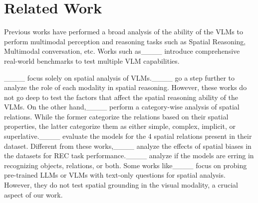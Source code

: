 \section{Related Work}
\label{sec:rel work}
Previous works have performed a broad analysis of the ability of the VLMs to perform multimodal perception and reasoning tasks such as Spatial Reasoning, Multimodal conversation, etc. Works such as____ introduce comprehensive real-world benchmarks to test multiple VLM capabilities.

____ focus solely on spatial analysis of VLMs.____ go a step further to analyze the role of each modality in spatial reasoning. However, these works do not go deep to test the factors that affect the spatial reasoning ability of the VLMs. On the other hand,____ perform a category-wise analysis of spatial relations. While the former categorize the relations based on their spatial properties, the latter categorize them as either simple, complex, implicit, or superlative.____ evaluate the models for the 4 spatial relations present in their dataset. Different from these works,____ analyze the effects of spatial biases in the datasets for REC task performance.____ analyze if the models are erring in recognizing objects, relations, or both. Some works like____ focus on probing pre-trained LLMs or VLMs with text-only questions for spatial analysis. However, they do not test spatial grounding in the visual modality, a crucial aspect of our work.

